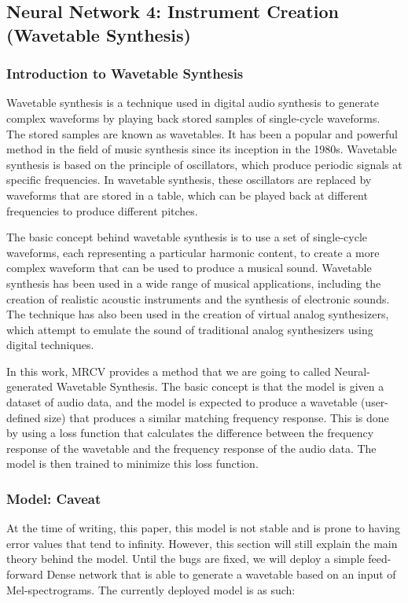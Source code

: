 \documentclass{article}
\begin{document}
\subsection{Neural Network 4: Instrument Creation (Wavetable Synthesis)}
\subsubsection{Introduction to Wavetable Synthesis}
Wavetable synthesis is a technique used in digital audio synthesis to generate complex waveforms by playing back stored samples of single-cycle waveforms. The stored samples are known as wavetables. It has been a popular and powerful method in the field of music synthesis since its inception in the 1980s. Wavetable synthesis is based on the principle of oscillators, which produce periodic signals at specific frequencies. In wavetable synthesis, these oscillators are replaced by waveforms that are stored in a table, which can be played back at different frequencies to produce different pitches. \citep{smith1991viewpoints}

The basic concept behind wavetable synthesis is to use a set of single-cycle waveforms, each representing a particular harmonic content, to create a more complex waveform that can be used to produce a musical sound. Wavetable synthesis has been used in a wide range of musical applications, including the creation of realistic acoustic instruments and the synthesis of electronic sounds. The technique has also been used in the creation of virtual analog synthesizers, which attempt to emulate the sound of traditional analog synthesizers using digital techniques.

In this work, MRCV provides a method that we are going to called Neural-generated Wavetable Synthesis. The basic concept is that the model is given a dataset of audio data, and the model is expected to produce a wavetable (user-defined size) that produces a similar matching frequency response. This is done by using a loss function that calculates the difference between the frequency response of the wavetable and the frequency response of the audio data. The model is then trained to minimize this loss function.

\subsubsection{Model: Caveat}
At the time of writing, this paper, this model is not stable and is prone to having error values that tend to infinity. However, this section will still explain the main theory behind the model. Until the bugs are fixed, we will deploy a simple feed-forward Dense network that is able to generate a wavetable based on an input of Mel-spectrograms. The currently deployed model is as such:
\end{document}
